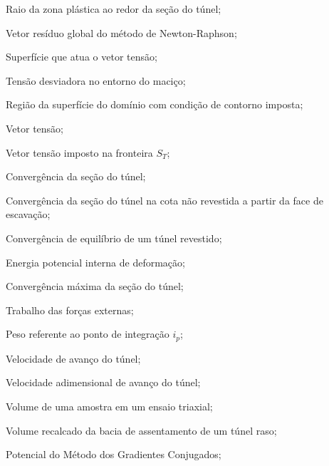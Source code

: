 \item[$ R^p $]			Raio da zona plástica ao redor da seção do túnel;
\item[$\Rl_i$]			Vetor resíduo global do método de Newton-Raphson;
\item[$ S $] 			Superfície que atua o vetor tensão;
\item[$ S_0 $] 			Tensão desviadora no entorno do maciço;
\item[$ S_T $] 			Região da superfície do domínio com condição de contorno imposta;
\item[$ \Tl $] 			Vetor tensão;
\item[$ \Tl^d $] 		Vetor tensão imposto na fronteira $S_T$;
\item[$ U $] 			Convergência da seção do túnel;
\item[$ U_{0} $] 		Convergência da seção do túnel na cota não revestida a partir da face de escavação;
\item[$ U_{eq} $] 		Convergência de equilíbrio de um túnel revestido;
\item[$ U_{int} $] 		Energia potencial interna de deformação;
\item[$ U_{max} $] 		Convergência máxima da seção do túnel;
\item[$ W_{ext} $] 		Trabalho das forças externas;
\item[$ W_{i_p} $] 		Peso referente ao ponto de integração $i_p$;
\item[$ V $] 			Velocidade de avanço do túnel;
\item[$ V^* $] 			Velocidade adimensional de avanço do túnel;
\item[$ V_a $] 			Volume de uma amostra em um ensaio triaxial;
\item[$ V_{bacia} $]	Volume recalcado da bacia de assentamento de um túnel raso;
\item[$V(\Delta \ul)$]	Potencial do Método dos Gradientes Conjugados;

